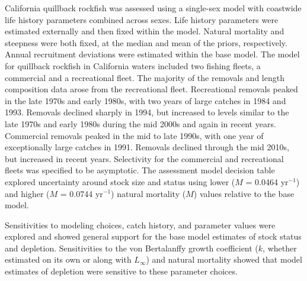 \documentclass[11pt,
  english,
  letterpaper,
]{article}
\begin{document}
\leavevmode\tagmcend\tagstructend\par


California quillback rockfish was assessed using a single-sex model with coastwide life history parameters combined across sexes. Life history parameters were estimated externally and then fixed within the model. Natural mortality and steepness were both fixed, at the median and mean of the priors, respectively. Annual recruitment deviations were estimated within the base model. The model for quillback rockfish in California waters included two fishing fleets, a commercial and a recreational fleet. The majority of the removals and length composition data arose from the recreational fleet. Recreational removals peaked in the late 1970s and early 1980s, with two years of large catches in 1984 and 1993. Removals declined sharply in 1994, but increased to levels similar to the late 1970s and early 1980s during the mid 2000s and again in recent years. Commercial removals peaked in the mid to late 1990s, with one year of exceptionally large catches in 1991. Removals declined through the mid 2010s, but increased in recent years. Selectivity for the commercial and recreational fleets was specified to be asymptotic. The assessment model decision table explored uncertainty around stock size and status using lower ({\(M\)\leavevmode\tagmcend\tagstructend} = 0.0464 yr{\(^{-1}\)\leavevmode\tagmcend\tagstructend}) and higher ({\(M\)\leavevmode\tagmcend\tagstructend} = 0.0744 yr{\(^{-1}\)\leavevmode\tagmcend\tagstructend}) natural mortality ({\(M\)\leavevmode\tagmcend\tagstructend}) values relative to the base model.

\leavevmode\tagmcend\tagstructend\par


Sensitivities to modeling choices, catch history, and parameter values were explored and showed general support for the base model estimates of stock status and depletion. Sensitivities to the von Bertalanffy growth coefficient ({\(k\)\leavevmode\tagmcend\tagstructend}, whether estimated on its own or along with {\(L_\infty\)\leavevmode\tagmcend\tagstructend}) and natural mortality showed that model estimates of depletion were sensitive to these parameter choices.
\end{document}
